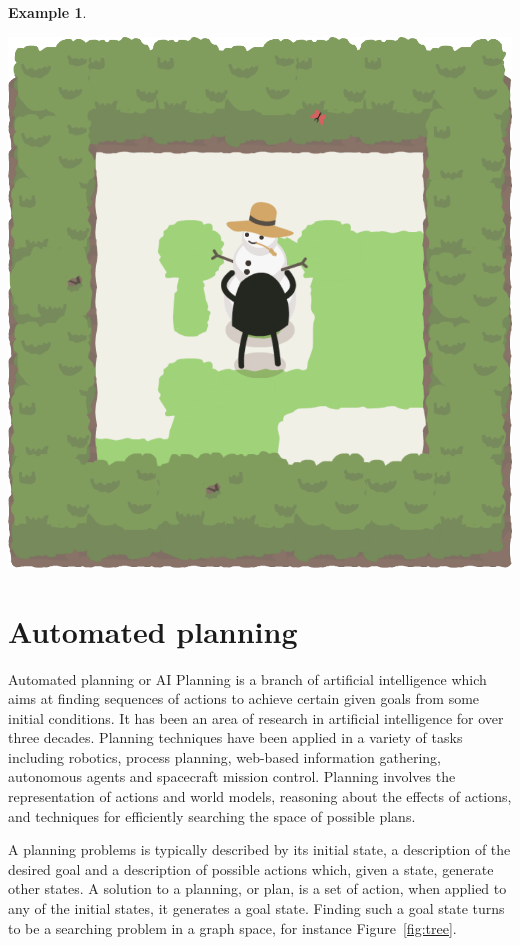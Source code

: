 \documentclass{report}
\theoremstyle{plain}
\newtheorem{example}{Example}[section]
\begin{document}
\begin{example}
\begin{center}
\includegraphics[width=\andyWidth\textwidth]{andy-basic-21.png}
\end{center}
\end{example}

\section{Automated planning}
Automated planning or AI Planning is a branch of artificial intelligence which aims at finding  sequences of actions to achieve certain given goals from some initial conditions. It has been an area of research in artificial intelligence for over three decades. Planning techniques have been applied in a variety of tasks including robotics, process planning, web-based information gathering, autonomous agents and spacecraft mission control. Planning involves the representation of actions and world models, reasoning about the effects of actions, and techniques for efficiently searching the space of possible plans.

A planning problems is typically described by its  initial state, a description of the desired goal and a description of possible actions which, given a state, generate other states. A solution to a planning, or plan, is a set of action, when applied to any of the initial states, it generates a goal state. Finding such a goal state turns to be a searching problem in a graph space, for instance Figure~\ref{fig:tree}.
\end{document}
